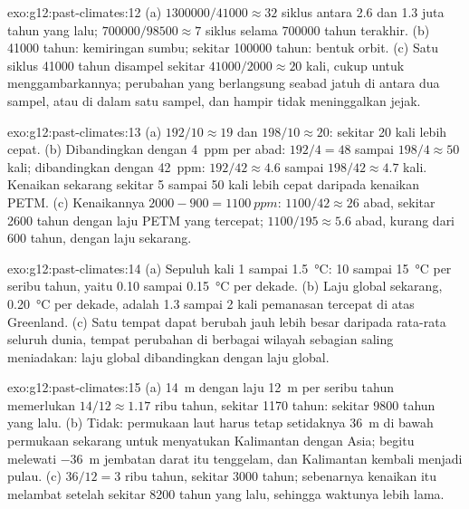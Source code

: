 \begin{solution}{exo:g12:past-climates:12}
(a) $\num{1300000}/\num{41000} \approx 32$ siklus antara 2.6 dan 1.3 juta
tahun yang lalu; $\num{700000}/\num{98500} \approx 7$ siklus selama
\num{700000} tahun terakhir. (b) \num{41000} tahun: kemiringan sumbu; sekitar
\num{100000} tahun: bentuk orbit. (c) Satu siklus \num{41000} tahun disampel
sekitar $\num{41000}/\num{2000} \approx 20$ kali, cukup untuk menggambarkannya;
perubahan yang berlangsung seabad jatuh di antara dua sampel, atau di dalam
satu sampel, dan hampir tidak meninggalkan jejak.
\end{solution}

\begin{solution}{exo:g12:past-climates:13}
(a) $192/10 \approx 19$ dan $198/10 \approx 20$: sekitar 20 kali lebih cepat.
(b) Dibandingkan dengan \qty{4}{ppm} per abad: $192/4 = 48$ sampai $198/4 \approx 50$
kali; dibandingkan dengan \qty{42}{ppm}: $192/42 \approx 4.6$ sampai $198/42 \approx 4.7$
kali. Kenaikan sekarang sekitar 5 sampai 50 kali lebih cepat daripada kenaikan
PETM. (c) Kenaikannya $2000 - 900 = \qty{1100}{ppm}$: $1100/42 \approx 26$
abad, sekitar \num{2600} tahun dengan laju PETM yang tercepat;
$1100/195 \approx 5.6$ abad, kurang dari 600 tahun, dengan laju sekarang.
\end{solution}

\begin{solution}{exo:g12:past-climates:14}
(a) Sepuluh kali 1 sampai \qty{1.5}{\degreeCelsius}: 10 sampai
\qty{15}{\degreeCelsius} per seribu tahun, yaitu 0.10 sampai
\qty{0.15}{\degreeCelsius} per dekade. (b) Laju global sekarang,
\qty{0.20}{\degreeCelsius} per dekade, adalah 1.3 sampai 2 kali pemanasan
tercepat di atas Greenland. (c) Satu tempat dapat berubah jauh lebih besar
daripada rata-rata seluruh dunia, tempat perubahan di berbagai wilayah sebagian
saling meniadakan: laju global dibandingkan dengan laju global.
\end{solution}

\begin{solution}{exo:g12:past-climates:15}
(a) \qty{14}{m} dengan laju \qty{12}{m} per seribu tahun memerlukan $14/12 \approx
1.17$ ribu tahun, sekitar \num{1170} tahun: sekitar \num{9800} tahun yang lalu.
(b) Tidak: permukaan laut harus tetap setidaknya \qty{36}{m} di bawah
permukaan sekarang untuk menyatukan Kalimantan dengan Asia; begitu melewati
\qty{-36}{m} jembatan darat itu tenggelam, dan Kalimantan kembali menjadi
pulau. (c) $36/12 = 3$ ribu tahun, sekitar \num{3000} tahun; sebenarnya
kenaikan itu melambat setelah sekitar \num{8200} tahun yang lalu, sehingga
waktunya lebih lama.
\end{solution}

